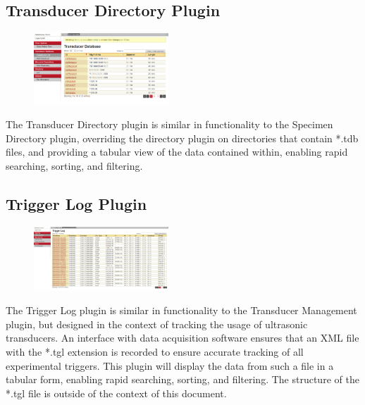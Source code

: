 \documentclass[10pt]{article}
\begin{document}
\subsection{Transducer Directory Plugin}
\begin{figure}
		\includegraphics[width=0.45\textwidth]{Transducer_Directory_Plugin.png}
\end{figure}
The Transducer Directory plugin is similar in functionality to the Specimen Directory plugin, overriding the directory plugin on directories that contain *.tdb files, and providing a tabular view of the data contained within, enabling rapid searching, sorting, and filtering.

\endgroup

\hfill \break
\hfill \break


\begingroup
\setlength\intextsep{0pt}
\subsection{Trigger Log Plugin}
\begin{figure}
		\includegraphics[width=0.45\textwidth]{Trigger_Log_Plugin.png}
\end{figure}
The Trigger Log plugin is similar in functionality to the Transducer Management plugin, but designed in the context of tracking the usage of ultrasonic transducers.  An interface with data acquisition software ensures that an XML file with the *.tgl extension is recorded to ensure accurate tracking of all experimental triggers.  This plugin will display the data from such a file in a tabular form, enabling rapid searching, sorting, and filtering.  The structure of the *.tgl file is outside of the context of this document.

\endgroup
\end{document}
